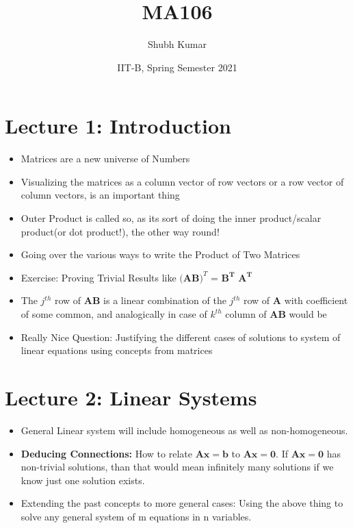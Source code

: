 \documentclass{article}
\title{MA106}
\author{Shubh Kumar}
\date{IIT-B, Spring Semester 2021}
\begin{document}
\maketitle

\section{Lecture 1: Introduction}
\begin{itemize}
    \item Matrices are a new universe of Numbers
    \item Visualizing the matrices as a column vector of row vectors or a row vector of column vectors, is an important thing
    \item Outer Product is called so, as its sort of doing the inner product/scalar product(or dot product!), the other way round!
    \item Going over the various ways to write the Product of Two Matrices

    \item Exercise: Proving Trivial Results like $\big(\textbf{AB}\big)^T$ = $\mathbf{B^{T}}$ $\mathbf{A^{T}}$

    \item The $j^{th}$ row of \textbf{AB} is a linear combination of the $j^{th}$ row of \textbf{A} with coefficient of some common, and analogically in case of $k^{th}$ column of \textbf{AB} would be
    \item Really Nice Question: Justifying the different cases of solutions to system of linear equations using concepts from matrices
\end{itemize}

\section{Lecture 2: Linear Systems}

\begin{itemize}
    \item General Linear system will include homogeneous as well as non-homogeneous.
    \item \textbf{Deducing Connections:} How to relate $\mathbf{Ax = b}$ to $\mathbf{Ax = 0}$. If $\mathbf{Ax = 0}$ has non-trivial solutions, than that would mean infinitely many solutions if we know just one solution exists.

    \item Extending the past concepts to more general cases: Using the above thing to solve any general system of m equations in n variables.

\end{itemize}
\end{document}
